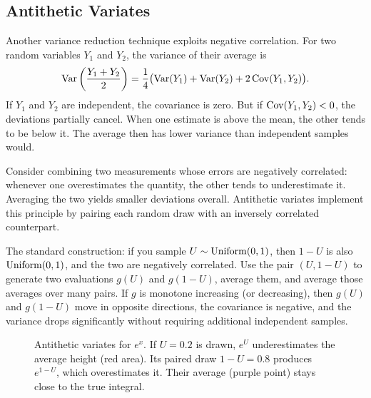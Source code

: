 \subsection{Antithetic Variates}
\label{ch35:antithetic}
Another variance reduction technique exploits negative correlation. For two random
variables $Y_1$ and $Y_2$, the variance of their average is
\[
  \operatorname{Var}\left(\frac{Y_1 + Y_2}{2}\right)
  = \frac{1}{4}\bigl(\operatorname{Var}(Y_1) + \operatorname{Var}(Y_2) + 2\operatorname{Cov}(Y_1,Y_2)\bigr).
\]
If $Y_1$ and $Y_2$ are independent, the covariance is zero. But if $\operatorname{Cov}(Y_1,Y_2) < 0$,
the deviations partially cancel. When one estimate is above the mean, the other tends to be below it.
The average then has lower variance than independent samples would.
\begin{intuitionbox}
Consider combining two measurements whose errors are negatively correlated: whenever
one overestimates the quantity, the other tends to underestimate it. Averaging the two
yields smaller deviations overall. Antithetic variates implement this principle by pairing
each random draw with an inversely correlated counterpart.
\end{intuitionbox}
The standard construction: if you sample $U \sim \operatorname{Uniform}(0,1)$, then $1-U$ is also
$\operatorname{Uniform}(0,1)$, and the two are negatively correlated. Use the pair
$(U, 1-U)$ to generate two evaluations $g(U)$ and $g(1-U)$, average them, and
average those averages over many pairs. If $g$ is monotone increasing (or
decreasing), then $g(U)$ and $g(1-U)$ move in opposite directions, the covariance
is negative, and the variance drops significantly without requiring additional independent samples.
\begin{figure}[H]
\centering
{}
\caption{Antithetic variates for $e^x$. If $U=0.2$ is drawn, $e^U$ underestimates the average height (red area). Its paired draw $1-U=0.8$ produces $e^{1-U}$, which overestimates it. Their average (purple point) stays close to the true integral.}
\label{ch35:fig-antithetic}
\end{figure}

